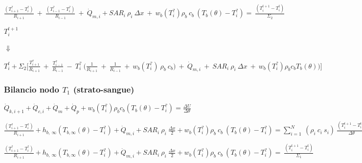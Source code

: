\begin{center}
	$ \frac{(T_{i+1} ^? - T_i ^? )}{R_{i+1}} \:+\:  \frac{(T_{i-1} ^? - T_i ^? )}{R_{i-1}} \:+\: \Dot{Q} _{m,i} + SAR_i \: \rho _{i} \: \Delta x  \:+\: w_b (T_i^?) \rho _b \: c_b \: (T_b(\theta)-T_i ^?) =  \: \frac{(T_i ^{t+1} - T_i ^t )}{\Sigma_2}$
\end{center}

\begin{center}
	$T_i ^{t+1}$
	\begin{center}
		\begin{center}
			$\Downarrow$
		\end{center}
	\end{center}
	$T_i ^t + \Sigma_2 \Bigg[ \frac{T_{i+1}^?}{R_{i+1}} \:+\: \frac{T_{i-1}^?}{R_{i-1}} \:-\: T_i ^? \:\Big(\frac{1}{R_{i+1}} \:+\: \frac{1}{R_{i-1}} \:+\:  w_b (T_i^?) \: \rho _b \: c_b  \Big) \:+\: \Dot{Q}_{m,i} \:+\: SAR_i \: \rho_i \: \Delta x \:+\:  w_b (T_i^?) \rho _b c_b T_b(\theta)\Big) \Bigg]$
\end{center}

\vspace{0.5cm}

\subsubsection*{Bilancio nodo $T_1$ (strato-sangue)}

\begin{center}
	$ \Dot{Q} _{k, i+1} +\Dot{Q} _{c, i}+ \Dot{Q} _{m} +\Dot{Q} _{p}+ w_b (T_i^?) \rho _b c_b (T_b(\theta)-T_i ^?)= \frac{\Delta U}{\Delta \theta} $
\end{center}

\begin{center}
	$ \frac{(T_{i+1} ^? - T_i ^? )}{R_{i+1}} + h_{b, \:\infty} (T_{b, \infty} (\theta) - T_i ^? )+ \Dot{Q} _{m,i} + SAR_i \: \rho _{i} \: \frac{\Delta x}{2}  + w_b (T_i^?) \rho _b \: c_b \: (T_b(\theta)-T_i ^?) = \sum_{i=1}^N \: \left( \rho _{i} \: c_{i} \: s_i \right) \: \frac{(T_i ^{t+1} - T_i ^t )}{\Delta \theta}$
\end{center}

\begin{center}
	$ \frac{(T_{i+1} ^? - T_i ^? )}{R_{i+1}} + h_{b, \:\infty} (T_{b, \infty} (\theta) - T_i ^? )+ \Dot{Q} _{m,i} + SAR_i \: \rho _{i} \: \frac{\Delta x}{2}  + w_b (T_i^?) \rho _b \: c_b \: (T_b(\theta)-T_i ^?) =  \: \frac{(T_i ^{t+1} - T_i ^t )}{\Sigma_1}$
\end{center}

